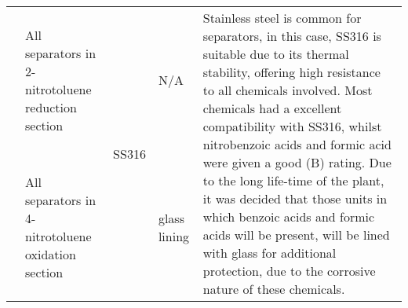 {\begin{tabular}{@{}lp{5cm}p{2cm}p{2cm}p{12cm}@{}}
                                                      & All separators in 2-nitrotoluene reduction section      & \multirow[t]{4}{=}{SS316}                                                                 & N/A                                               & \multirow[t]{4}{=}{Stainless steel is common for separators, in this case, SS316 is suitable due to its thermal stability, offering high resistance to all chemicals involved. Most chemicals had a excellent compatibility with SS316, whilst nitrobenzoic acids and formic acid were given a good (B) rating. Due to the long life-time of the plant, it was decided that those units in which benzoic acids and formic acids will be present, will be lined with glass for additional protection, due to the corrosive nature of these chemicals.}                                                                                                                                                                                                                                                                                                                                                                \\ \cmidrule(l){2-2} \cmidrule(l){4-4}
                                                      & All separators in 4-nitrotoluene oxidation section      &                                                                                        & \multirow[t]{3}{=}{glass lining}                     &                                                                                                                                                                                                                                                                                                                                                                                                                                                                                                                                                                                                                                                                                                                                                                                                                                                                                                                    \\ \cmidrule(l){2-2}

\end{tabular}}
